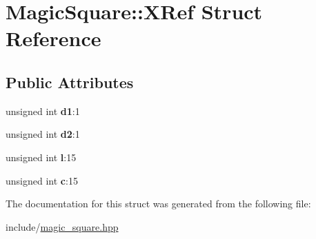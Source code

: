 \hypertarget{structMagicSquare_1_1XRef}{\section{\-Magic\-Square\-:\-:\-X\-Ref \-Struct \-Reference}
\label{structMagicSquare_1_1XRef}
}
\subsection*{\-Public \-Attributes}
\begin{DoxyCompactItemize}
\item 
\hypertarget{structMagicSquare_1_1XRef_a9da1ebfcf74bd506f8705783e92d764f}{unsigned int {\bfseries d1}\-:1}\label{structMagicSquare_1_1XRef_a9da1ebfcf74bd506f8705783e92d764f}

\item 
\hypertarget{structMagicSquare_1_1XRef_ad1d07d5c5ff273961e4329af5a8ff2d0}{unsigned int {\bfseries d2}\-:1}\label{structMagicSquare_1_1XRef_ad1d07d5c5ff273961e4329af5a8ff2d0}

\item 
\hypertarget{structMagicSquare_1_1XRef_af86bd806c544303f25ee0feca31afc57}{unsigned int {\bfseries l}\-:15}\label{structMagicSquare_1_1XRef_af86bd806c544303f25ee0feca31afc57}

\item 
\hypertarget{structMagicSquare_1_1XRef_aac7b71199e3718a13b6a7853469ace7e}{unsigned int {\bfseries c}\-:15}\label{structMagicSquare_1_1XRef_aac7b71199e3718a13b6a7853469ace7e}

\end{DoxyCompactItemize}


\-The documentation for this struct was generated from the following file\-:\begin{DoxyCompactItemize}
\item 
include/\hyperlink{magic__square_8hpp}{magic\-\_\-square.\-hpp}\end{DoxyCompactItemize}
